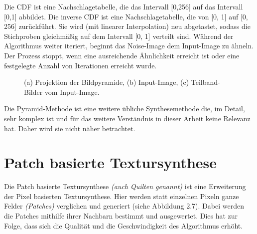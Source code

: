 \documentclass[12pt, a4paper,twoside,openright]{report} %
\begin{document}
Die CDF ist eine Nachschlagetabelle, die das Intervall {[0,256]} auf das Intervall {[0,1]} abbildet.
Die inverse CDF ist eine Nachschlagetabelle, die von {[0, 1]} auf {[0, 256]} zurückführt.
Sie wird {(mit linearer Interpolation)} neu abgetastet,
sodass die Stichproben gleichmäßig auf dem Intervall {[0, 1]} verteilt sind. \cite{Heeger}
\newline
Während der Algorithmus weiter iteriert, beginnt das Noise-Image dem Input-Image zu ähneln.
Der Prozess stoppt, wenn eine ausreichende Ähnlichkeit erreicht ist oder eine festgelegte Anzahl von Iterationen erreicht wurde.

\begin{figure}[H]
    \centering
    \qquad
    \qquad
    \caption{(a) Projektion der Bildpyramide, (b) Input-Image, (c) Teilband-Bilder vom Input-Image.}%
\end{figure}

Die Pyramid-Methode ist eine weitere übliche Synthesemethode die, im Detail, sehr komplex ist und für das weitere Verständnis in dieser Arbeit keine Relevanz hat.
Daher wird sie nicht näher betrachtet.

\section{Patch basierte Textursynthese}

Die Patch basierte Textursynthese \textit{(auch Quilten genannt)} ist eine Erweiterung der Pixel basierten Textursynthese.
Hier werden statt einzelnen Pixeln ganze Felder \textit{(Patches)} verglichen und generiert {(siehe Abbildung 2.7)}.
Dabei werden die Patches mithilfe ihrer Nachbarn bestimmt und ausgewertet.
Dies hat zur Folge, dass sich die Qualität und die Geschwindigkeit des Algorithmus erhöht.
\end{document}

